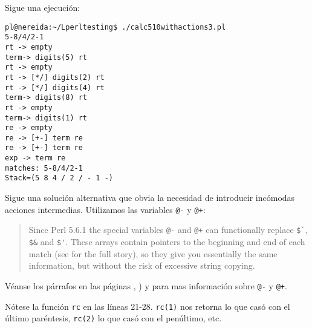 \begin{verbatim}
\end{verbatim}

Sigue una ejecución:
\begin{verbatim}
pl@nereida:~/Lperltesting$ ./calc510withactions3.pl
5-8/4/2-1
rt -> empty
term-> digits(5) rt
rt -> empty
rt -> [*/] digits(2) rt
rt -> [*/] digits(4) rt
term-> digits(8) rt
rt -> empty
term-> digits(1) rt
re -> empty
re -> [+-] term re
re -> [+-] term re
exp -> term re
matches: 5-8/4/2-1
Stack=(5 8 4 / 2 / - 1 -)
\end{verbatim}


Sigue una solución alternativa que obvia la necesidad de introducir
incómodas acciones intermedias. Utilizamos 
las variables \verb|@-| y \verb|@+|:
 
\begin{it}\begin{quotation}
Since Perl 5.6.1 the special variables \verb|@-| and \verb|@+| can functionally replace
\verb|$`|, \verb|$&| and \verb|$'|. These arrays contain pointers to the beginning and end of
each match (see  for the full story), so they give you essentially
the same information, but without the risk of excessive string copying.
\end{quotation}\end{it}

Véanse los párrafos en las páginas
\pageref{parrafo:fincas}, \pageref{parrafo:iniciocas}) y
\pageref{parrafo:lastpar} para mas información sobre \verb|@-| y \verb|@+|.

Nótese la función \verb|rc| en las líneas
21-28. \verb|rc(1)| nos retorna lo que casó con el último paréntesis,
\verb|rc(2)| lo que casó con el penúltimo, etc.


